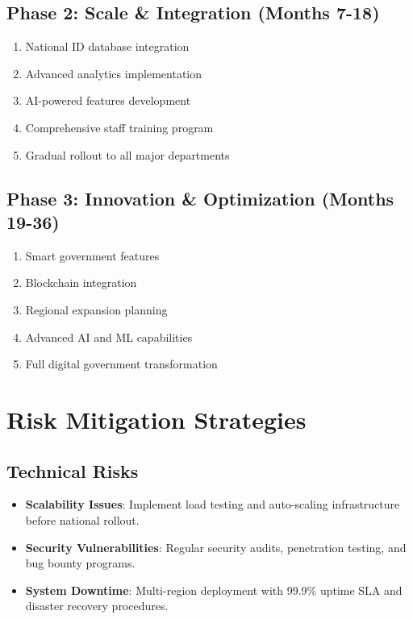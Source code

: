 \documentclass[12pt,a4paper]{article}
\begin{document}
\subsection{Phase 2: Scale \& Integration (Months 7-18)}
\begin{enumerate}[leftmargin=*]
    \item National ID database integration
    \item Advanced analytics implementation
    \item AI-powered features development
    \item Comprehensive staff training program
    \item Gradual rollout to all major departments
\end{enumerate}

\subsection{Phase 3: Innovation \& Optimization (Months 19-36)}
\begin{enumerate}[leftmargin=*]
    \item Smart government features
    \item Blockchain integration
    \item Regional expansion planning
    \item Advanced AI and ML capabilities
    \item Full digital government transformation
\end{enumerate}

\section{Risk Mitigation Strategies}

\subsection{Technical Risks}
\begin{itemize}[leftmargin=*]
    \item \textbf{Scalability Issues}: Implement load testing and auto-scaling infrastructure before national rollout.
    \item \textbf{Security Vulnerabilities}: Regular security audits, penetration testing, and bug bounty programs.
    \item \textbf{System Downtime}: Multi-region deployment with 99.9\% uptime SLA and disaster recovery procedures.
\end{itemize}
\end{document}
